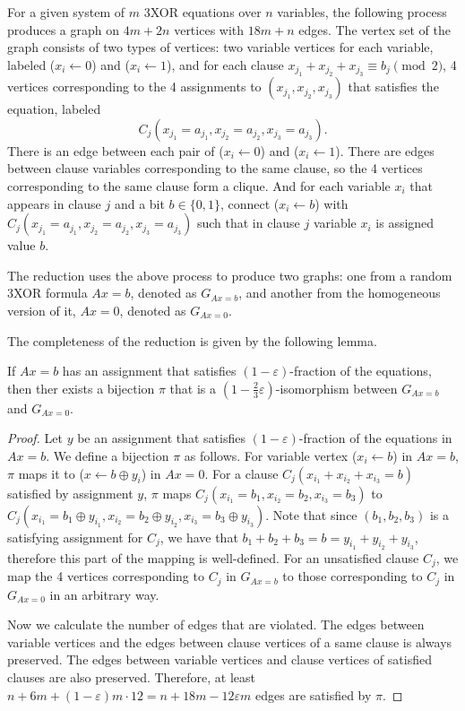 \documentclass[a4paper,twoside,justified]{tufte-handout}
\begin{document}
For a given system of $m$ 3XOR equations over $n$ variables, the following process produces a graph
on $4m+2n$ vertices with $18m+n$ edges. The vertex set of the graph consists of two types of vertices:
two variable vertices for each
variable, labeled ($x_i \leftarrow 0$) and ($x_i \leftarrow 1$),
and for each clause $x_{j_1}+x_{j_2}+x_{j_3} \equiv b_j \pmod{2}$, 4 vertices corresponding
to the 4 assignments to $(x_{j_1},x_{j_2},x_{j_3})$ that satisfies the equation,
labeled 
\[
C_j(x_{j_1}=a_{j_1}, x_{j_2}=a_{j_2}, x_{j_3}=a_{j_3}).
\]
There is an edge between each pair of ($x_i \leftarrow 0$) and ($x_i \leftarrow 1$).
There are edges between clause variables corresponding to the same clause, so the 4 vertices corresponding
to the same clause form a clique. And for each variable
$x_i$ that appears in clause $j$ and a bit $b \in \{0,1\}$, connect
($x_i \leftarrow b$) with $C_j(x_{j_1}=a_{j_1}, x_{j_2}=a_{j_2}, x_{j_3}=a_{j_3})$ such that in clause $j$ variable $x_i$ is assigned
value $b$.

The reduction uses the above process to produce two graphs: one from a random 3XOR formula $Ax=b$,
denoted as $G_{Ax=b}$, and another from the homogeneous version of it, $Ax=0$, denoted as $G_{Ax=0}$.

The completeness of the reduction is given by the following lemma.
\begin{lemma}\label{lemma:completeness}
  If $Ax=b$ has an assignment that satisfies $(1-\varepsilon)$-fraction of the equations,
  then ther exists a bijection $\pi$ that is a $(1-\frac{2}{3}\varepsilon)$-isomorphism between 
  $G_{Ax=b}$ and $G_{Ax=0}$.
\end{lemma}
\begin{proof}
  Let $y$ be an assignment that satisfies $(1-\varepsilon)$-fraction of the equations in $Ax=b$. We define
  a bijection $\pi$ as follows.
  For variable vertex ($x_i \leftarrow b$) in $Ax=b$, $\pi$ maps it to ($x \leftarrow b \oplus y_i$)
  in $Ax=0$. For a clause $C_j(x_{i_1}+x_{i_2}+x_{i_3}=b)$ satisfied by assignment $y$, $\pi$ maps
  $C_j(x_{i_1}=b_1,x_{i_2}=b_2,x_{i_3}=b_3)$ to $C_j(x_{i_1}=b_1 \oplus y_{i_1}, x_{i_2}=b_2 \oplus y_{i_2}, x_{i_3}=b_3 \oplus y_{i_3})$.
  Note that since $(b_1,b_2,b_3)$ is a satisfying assignment for $C_j$, we have that
  $b_1+b_2+b_3 = b = y_{i_1}+y_{i_2}+y_{i_3}$, therefore this part of the mapping is well-defined.
  For an unsatisfied clause $C_j$, we map the 4 vertices corresponding to $C_j$ in $G_{Ax=b}$
  to those corresponding to $C_j$ in $G_{Ax=0}$ in an arbitrary way.

  Now we calculate the number of edges that are violated. The edges between variable vertices and the edges between
  clause vertices of a same clause is always preserved. The edges between variable vertices and clause vertices
  of satisfied clauses are also preserved. Therefore, at least $n+6m+(1-\varepsilon)m \cdot 12=n+18m-12\varepsilon m$ edges
  are satisfied by $\pi$.
\end{proof}
\end{document}
